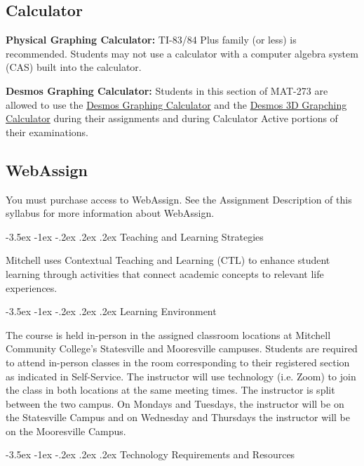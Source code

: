 \documentclass{article}
\makeatletter
\renewcommand\section{\@startsection{section}{1}{0pt}%
  {-3.5ex \@plus -1ex \@minus -.2ex}%
  {.2ex \@plus.2ex}%
  {\normalfont\Large\bfseries}} %
\makeatother
\begin{document}
\subsection{Calculator}

\textbf{Physical Graphing Calculator:} TI-83/84 Plus family (or less) is recommended. Students may not use a calculator with a computer algebra system (CAS) built into the calculator.

\textbf{Desmos Graphing Calculator:} Students in this section of MAT-273 are allowed to use the \href{https://www.desmos.com/calculator}{Desmos Graphing Calculator} and the \href{http://www.desmos.com/3d}{Desmos 3D Grapching Calculator} during their assignments and during Calculator Active portions of their examinations.

\subsection{WebAssign}

You must purchase access to WebAssign. See the Assignment Description of this syllabus for more information about WebAssign.

\section{Teaching and Learning Strategies}

Mitchell uses Contextual Teaching and Learning (CTL) to enhance student learning through activities that connect academic concepts to relevant life experiences.

\section{Learning Environment}

The course is held in-person in the assigned classroom locations at Mitchell Community College's Statesville and Mooresville campuses. Students are required to attend in-person classes in the room corresponding to their registered section as indicated in Self-Service. The instructor will use technology (i.e. Zoom) to join the class in both locations at the same meeting times. The instructor is split between the two campus. On Mondays and Tuesdays, the instructor will be on the Statesville Campus and on Wednesday and Thursdays the instructor will be on the Mooresville Campus.

\section{Technology Requirements and Resources}
\end{document}
